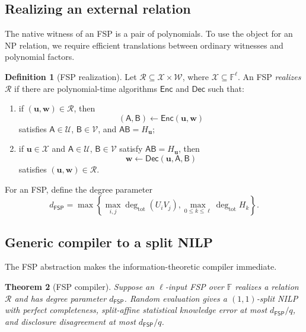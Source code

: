 \documentclass[11pt]{article}
\newtheorem{theorem}{Theorem}[section]
\theoremstyle{definition}
\newtheorem{definition}[theorem]{Definition}
\newcommand{\F}{\mathbb F}
\newcommand{\cR}{\mathcal R}
\newcommand{\cU}{\mathcal U}
\newcommand{\cV}{\mathcal V}
\newcommand{\FSP}{\mathsf{FSP}}
\newcommand{\Enc}{\mathsf{Enc}}
\newcommand{\Dec}{\mathsf{Dec}}
\begin{document}
\subsection{Realizing an external relation}

The native witness of an FSP is a pair of polynomials.  To use the object for
an NP relation, we require efficient translations between ordinary witnesses
and polynomial factors.

\begin{definition}[FSP realization]
\label{def:fsp-realization}
Let $\cR\subseteq\mathcal X\times\mathcal W$, where
$\mathcal X\subseteq\F^\ell$.  An FSP \emph{realizes} $\cR$ if there are
polynomial-time algorithms $\Enc$ and $\Dec$ such that:
\begin{enumerate}[label=(\roman*)]
  \item if $(\mathbf u,\mathbf w)\in\cR$, then
  \[
    (\mathsf A,\mathsf B)\leftarrow\Enc(\mathbf u,\mathbf w)
  \]
  satisfies $\mathsf A\in\cU$, $\mathsf B\in\cV$, and
  $\mathsf A\mathsf B=H_{\mathbf u}$;
  \item if $\mathbf u\in\mathcal X$ and
  $\mathsf A\in\cU$, $\mathsf B\in\cV$ satisfy
  $\mathsf A\mathsf B=H_{\mathbf u}$, then
  \[
    \mathbf w\leftarrow\Dec(\mathbf u,\mathsf A,\mathsf B)
  \]
  satisfies $(\mathbf u,\mathbf w)\in\cR$.
\end{enumerate}
\end{definition}

For an FSP, define the degree parameter
\begin{equation}
  d_{\FSP}
  =\max\left\{
      \max_{i,j}\deg_{\mathrm{tot}}(U_iV_j),
      \max_{0\le k\le\ell}\deg_{\mathrm{tot}}H_k
    \right\}.
  \label{eq:fsp-degree}
\end{equation}

\subsection{Generic compiler to a split NILP}

The FSP abstraction makes the information-theoretic compiler immediate.

\begin{theorem}[FSP compiler]
\label{thm:fsp-compiler}
Suppose an $\ell$-input FSP over $\F$ realizes a relation $\cR$ and has
degree parameter $d_{\FSP}$.  Random evaluation gives a $(1,1)$-split NILP
with perfect completeness, split-affine statistical knowledge error at most
$d_{\FSP}/q$, and disclosure disagreement at most $d_{\FSP}/q$.
\end{theorem}
\end{document}
